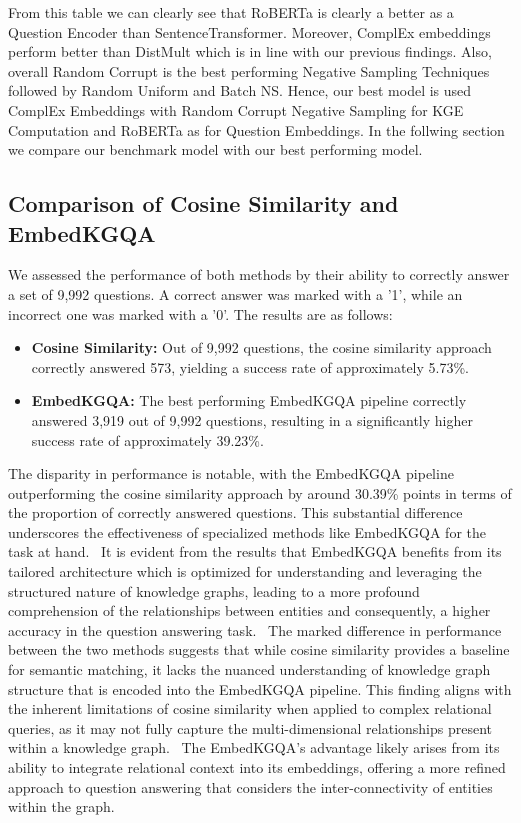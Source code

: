 \documentclass{article}
\begin{document}
From this table we can clearly see that RoBERTa is clearly a better as a Question Encoder than SentenceTransformer. Moreover, ComplEx embeddings perform better than DistMult which is in line with our previous findings. Also, overall Random Corrupt is the best performing Negative Sampling Techniques followed by Random Uniform and Batch NS.
Hence, our best model is used ComplEx Embeddings with Random Corrupt Negative Sampling for KGE Computation and RoBERTa as for Question Embeddings. In the follwing section we compare our benchmark model with our best performing model.

\subsection{Comparison of Cosine Similarity and EmbedKGQA}
We assessed the performance of both methods by their ability to correctly answer a set of 9,992 questions. A correct answer was marked with a '1', while an incorrect one was marked with a '0'. The results are as follows:
\begin{itemize}
    \item \textbf{Cosine Similarity:} Out of 9,992 questions, the cosine similarity approach correctly answered 573, yielding a success rate of approximately 5.73\%.
    \item \textbf{EmbedKGQA:} The best performing EmbedKGQA pipeline correctly answered 3,919 out of 9,992 questions, resulting in a significantly higher success rate of approximately 39.23\%.
\end{itemize}

The disparity in performance is notable, with the EmbedKGQA pipeline outperforming the cosine similarity approach by around 30.39\% points in terms of the proportion of correctly answered questions. This substantial difference underscores the effectiveness of specialized methods like EmbedKGQA for the task at hand.
\
It is evident from the results that EmbedKGQA benefits from its tailored architecture which is optimized for understanding and leveraging the structured nature of knowledge graphs, leading to a more profound comprehension of the relationships between entities and consequently, a higher accuracy in the question answering task.
\
The marked difference in performance between the two methods suggests that while cosine similarity provides a baseline for semantic matching, it lacks the nuanced understanding of knowledge graph structure that is encoded into the EmbedKGQA pipeline. This finding aligns with the inherent limitations of cosine similarity when applied to complex relational queries, as it may not fully capture the multi-dimensional relationships present within a knowledge graph.
\
The EmbedKGQA's advantage likely arises from its ability to integrate relational context into its embeddings, offering a more refined approach to question answering that considers the inter-connectivity of entities within the graph.
\end{document}
